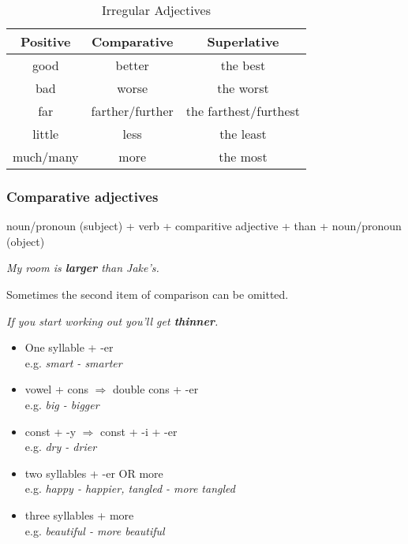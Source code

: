 \documentclass[hidelinks,10pt,a4paper]{article}
\begin{document}
\begin{table}[h]
\begin{center}
\begin{tabular}{|c|c|c|}
	\hline
	\textbf{Positive} & \textbf{Comparative}  & \textbf{Superlative} \\ \hline
	good & better & the best \\ \hline
	bad & worse & the worst \\ \hline
	far & farther/further & the farthest/furthest \\ \hline
	little & less & the least \\ \hline
	much/many & more & the most \\ \hline
\end{tabular}
\end{center}
\caption{Irregular Adjectives} \label{tab:pcs2}
\end{table}

\subsubsection{Comparative adjectives}
noun/pronoun (subject) + verb + comparitive adjective + than + noun/pronoun (object)

\begin{center}
	\textit{My room is \textbf{larger} than Jake's.}
\end{center}

Sometimes the second item of comparison can be omitted.
\begin{center}
	\textit{If you start working out you'll get \textbf{thinner}.}
\end{center}

\begin{itemize}
	\item One syllable + -er \\
		e.g. \textit{smart - smarter}
	\item vowel + cons $\Rightarrow$ double cons + -er \\
		e.g. \textit{big - bigger}
	\item const + -y $\Rightarrow$ const + -i + -er \\
		e.g. \textit{dry - drier}
	\item two syllables + -er OR more \\
		e.g. \textit{happy - happier, tangled - more tangled}
	\item three syllables + more \\
		e.g. \textit{beautiful - more beautiful}
\end{itemize}
\end{document}
